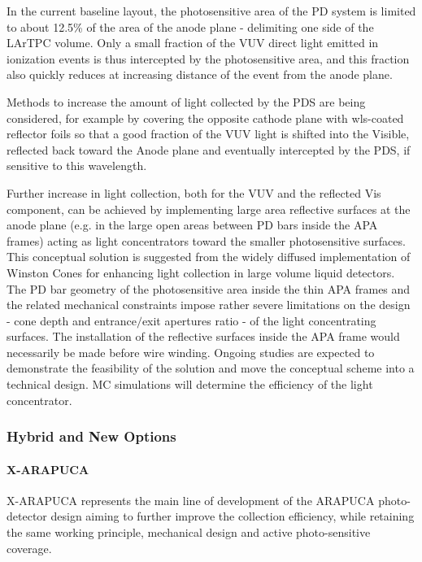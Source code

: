 In the current baseline layout, the photosensitive area of the PD system is limited to about 12.5\% of the area of the anode plane - delimiting one side of the LArTPC volume. 
Only a small fraction of the VUV direct light emitted in ionization events is thus intercepted by the photosensitive area, and this fraction also quickly reduces at increasing distance of the event from the anode plane. 

Methods to increase the amount of light collected by the PDS are being considered, for example by covering the opposite cathode plane with wls-coated reflector foils so that a good fraction of the VUV light is shifted into the Visible, reflected back toward the Anode plane and eventually intercepted by the PDS, if sensitive to this wavelength.

Further increase in light collection, both for the VUV and the reflected Vis component, can be achieved by implementing large area reflective surfaces at the anode plane (e.g. in the large open areas between PD bars inside the APA frames) acting as light concentrators toward the smaller photosensitive surfaces.  
This conceptual solution is suggested from the widely diffused implementation of Winston Cones for enhancing light collection in large volume liquid detectors. 
The PD bar geometry of the photosensitive area inside the thin APA frames and the related mechanical constraints impose rather severe limitations on the design - cone depth and entrance$/$exit apertures ratio - of the light concentrating surfaces. The installation of the reflective surfaces inside the APA frame would necessarily be made before wire winding. 
Ongoing studies are expected to demonstrate the feasibility of the solution and move the conceptual scheme into a technical design. MC simulations will determine the efficiency of the light concentrator. 


\subsubsection{Hybrid and New Options}

\paragraph*{X-ARAPUCA}  X-ARAPUCA represents the main line of development of the ARAPUCA photo-detector design aiming to further improve the collection efficiency, while retaining the same working
 principle, mechanical design and active  photo-sensitive coverage.
 
